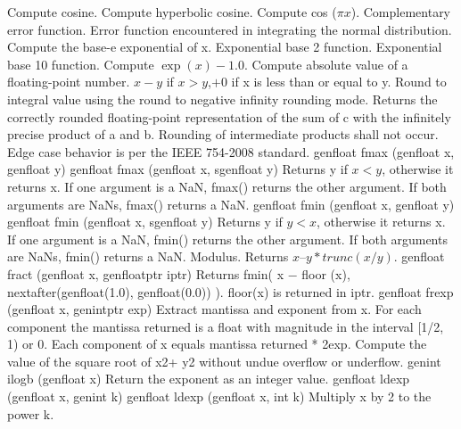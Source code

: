  {Compute cosine.}
 {Compute hyperbolic cosine.}
 { Compute cos ($\pi  x$).}
 {Complementary error function.}
 {Error function encountered in integrating the normal
distribution.}
 { Compute the base-e exponential of x.}
 {Exponential base 2 function.}
 {Exponential base 10 function.}
 { Compute $\exp{(x)}-1.0$.}
 {Compute absolute value of a floating-point number.}
 {$ x - y$  if $ x > y$,$ +0$ if x is less than or
equal to y.}
 {Round to integral value using the round to negative infinity
rounding mode.}
{
Returns the correctly rounded floating-point
representation of the sum of c with the infinitely
precise product of a and b. Rounding of
intermediate products shall not occur. Edge case
behavior is per the IEEE 754-2008 standard.
}
\addRowTwoSL
{  genfloat fmax (genfloat x, genfloat y)}
{  genfloat fmax (genfloat x, sgenfloat y)}
{
Returns y if $x < y$, otherwise it returns x. If one
argument is a NaN, fmax() returns the other
argument. If both arguments are NaNs, fmax()
returns a NaN.
}
\addRowTwoSL
{ genfloat fmin (genfloat x, genfloat y)}
{ genfloat fmin (genfloat x, sgenfloat y)}
{
Returns y if $y < x$, otherwise it returns x. If one
argument is a NaN, fmin() returns the other
argument. If both arguments are NaNs, fmin()
returns a NaN.
}
 {
  Modulus. Returns $x – y * trunc (x/y)$.
  }
\addRow
{ genfloat fract (genfloat x, genfloatptr iptr)}
{
  Returns fmin( x $-$ floor (x), nextafter(genfloat(1.0), genfloat(0.0)) ). floor(x) is returned in iptr.
}
\addRow
{ genfloat frexp (genfloat x,  genintptr exp)}
{
Extract mantissa and exponent from x. For each
component the mantissa returned is a float with
magnitude in the interval [1/2, 1) or 0. Each
component of x equals mantissa returned * 2exp.
}
{
  Compute the value of the square root of x2+ y2 without undue overflow or underflow.
}
\addRow
{genint ilogb (genfloat x)}
{
  Return the exponent as an integer value.
}
\addRowTwoSL
{  genfloat ldexp (genfloat x, genint k) }
{  genfloat ldexp (genfloat x, int k) }
{
  Multiply x by 2 to the power k.
}


